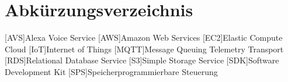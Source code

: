 

\chapter{Abkürzungsverzeichnis}

\begin{acronym}[MQTT]
	[AVS]{Alexa Voice Service}
    [AWS]{Amazon Web Services}
    [EC2]{Elastic Compute Cloud}
    [IoT]{Internet of Things}
    [MQTT]{Message Queuing Telemetry Transport}
    [RDS]{Relational Database Service}
    [S3]{Simple Storage Service}
    [SDK]{Software Development Kit}
    [SPS]{Speicherprogrammierbare Steuerung}
\end{acronym}
